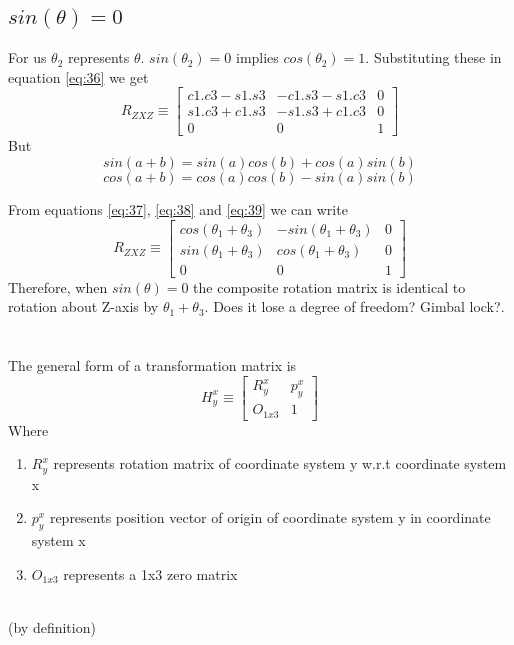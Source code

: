 \documentclass[12pt]{article}
\newcommand{\bydefn}{{\\ \color{blue} \hspace*{\fill}(by definition)} \\}
\newcommand{\rz}[1]{\begin{bmatrix} cos(#1) & -sin(#1) & 0 \\ sin(#1) & cos(#1) & 0 \\ 0 & 0 & 1 \end{bmatrix}}
\begin{document}
\subsection{$sin(\theta) = 0$}
For us $\theta_2$ represents $\theta$.
$sin(\theta_2) = 0$ implies $cos(\theta_2) = 1$. Substituting these in equation \ref{eq:36} we get
\begin{equation}
  \label{eq:37}
  R_{ZXZ} \equiv \begin{bmatrix} c1.c3 - s1.s3 & -c1.s3 - s1.c3 & 0 \\ s1.c3 + c1.s3 & -s1.s3 + c1.c3 & 0 \\ 0 & 0 & 1 \end{bmatrix}
\end{equation}
But
\begin{equation}
  \label{eq:38}
  sin(a + b) = sin(a)cos(b) + cos(a)sin(b)
\end{equation}
\begin{equation}
  \label{eq:39}
  cos(a + b) = cos(a)cos(b) - sin(a)sin(b)
\end{equation}

From equations \ref{eq:37}, \ref{eq:38} and \ref{eq:39} we can write
\begin{equation}
  \label{eq:310}
  R_{ZXZ} \equiv \rz{\theta_1 + \theta_3}
\end{equation}
Therefore, when $sin(\theta) = 0$ the composite rotation matrix is identical to rotation about Z-axis by $ \theta_1 + \theta_3 $.
{\color{red} Does it lose a degree of freedom? Gimbal lock?}.

\pagebreak

\section{}
\subsection{}
The general form of a transformation matrix is
\[
  H_{y}^{x} \equiv \begin{bmatrix} R_{y}^{x} & p_{y}^{x} \\ O_{1x3} & 1 \end{bmatrix}
\]
Where
\begin{enumerate}[nolistsep]
  \item $ R_{y}^{x} $ represents rotation matrix of coordinate system y w.r.t coordinate system x
  \item $ p_{y}^{x} $ represents position vector of origin of coordinate system y in coordinate system x
  \item $ O_{1x3} $ represents a 1x3 zero matrix
\end{enumerate}
\bydefn
\end{document}
